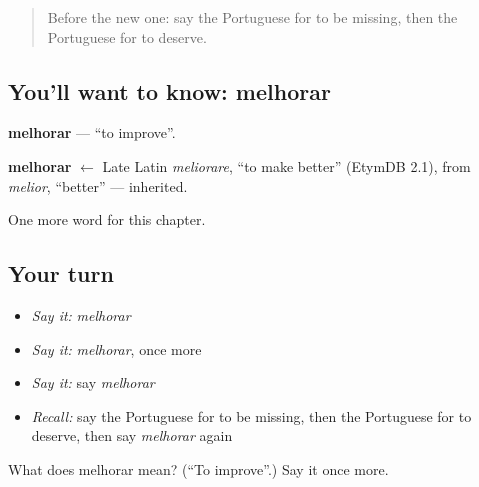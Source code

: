 \label{lesson:PT-C175-melhorar}



\begin{quote}
Before the new one: say the Portuguese for to be missing, then the Portuguese for to deserve.
\end{quote}

\subsection*{You'll want to know: melhorar}
\textbf{melhorar} — \textquotedblleft{}to improve\textquotedblright{}.

\begin{cousinweb}
\textbf{melhorar} $\leftarrow$ Late Latin \emph{meliorare}, \textquotedblleft{}to make better\textquotedblright{} (EtymDB 2.1), from \emph{melior}, \textquotedblleft{}better\textquotedblright{} — inherited.
\end{cousinweb}

\begin{grammarlens}[title={What you've built}]
One more word for this chapter.
\end{grammarlens}

\subsection*{Your turn}
\begin{itemize}
\raggedright
  \item \emph{Say it:} \emph{melhorar}
  \item \emph{Say it:} \emph{melhorar}, once more
  \item \emph{Say it:} say \emph{melhorar}
  \item \emph{Recall:} say the Portuguese for to be missing, then the Portuguese for to deserve, then say \emph{melhorar} again
\end{itemize}

\begin{tcolorbox}[breakable,colback=teal!4,colframe=teal!35!black,title={Before you move on}]
What does melhorar mean? (\textquotedblleft{}To improve\textquotedblright{}.) Say it once more.
\end{tcolorbox}
